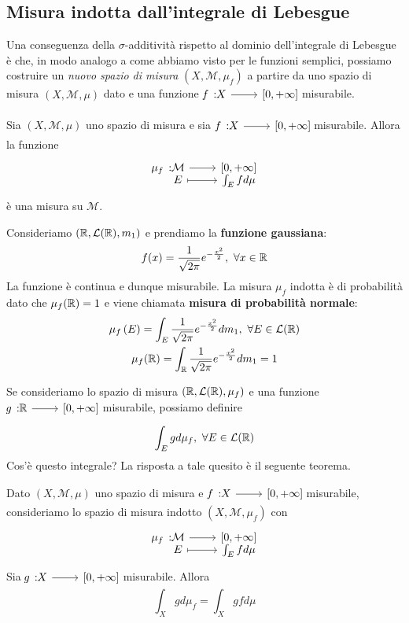 \subsection{Misura indotta dall'integrale di Lebesgue}\label{misuraindotta}
Una conseguenza della $\sigma$-additività rispetto al dominio dell'integrale di Lebesgue è che, in modo analogo a come abbiamo visto per le funzioni semplici, possiamo costruire un \textit{nuovo spazio di misura} $\left(X,\mathcal{M},\mu_f\right)$ a partire da uno spazio di misura $\left(X,\mathcal{M},\mu\right)$ dato e una funzione $\funz{f}{X}{\left[0,+\infty\right]}$ misurabile.
\begin{corollaryqed}
Sia $\left(X,\mathcal{M},\mu\right)$ uno spazio di misura e sia $\funz{f}{X}{\left[0,+\infty\right]}$ misurabile. Allora la funzione
\begin{equation}
	\funztot{\mu_f}{\mathcal{M}}{\left[0,+\infty\right]}{E}{\int_Efd\mu}
\end{equation}
è una misura su $\mathcal{M}$.
\end{corollaryqed}
\begin{example}\label{gaussiana}
	Consideriamo $\left(\mathbb{R},\mathcal{L}(\mathbb{R}),m_1\right)$ e prendiamo la \textbf{funzione gaussiana}:
	\begin{equation*}
		f(x)=\frac{1}{\sqrt{2\pi}}e^{-\frac{x^2}{2}},\ \forall x\in\realset
	\end{equation*}
	La funzione è continua e dunque misurabile. La misura $\mu_f$ indotta è di probabilità dato che $\mu_f(\mathbb{R})=1$ e viene chiamata \textbf{misura di probabilità normale}:
	\begin{gather*}
		\mu_f\left(E\right)=\int_E\frac{1}{\sqrt{2\pi}}e^{-\frac{x^2}{2}}dm_1,\ \forall E\in\mathcal{L}(\realset)\\
		\mu_f(\realset)=\int_{\realset}\frac{1}{\sqrt{2\pi}}e^{-\frac{x^2}{2}}dm_1=1
	\end{gather*}
\end{example}
Se consideriamo lo spazio di misura $\left(\mathbb{R},\mathcal{L}(\mathbb{R}),\mu_f\right)$ e una funzione $\funz{g}{\realset}{\left[0,+\infty\right]}$ misurabile, possiamo definire \begin{equation*}
	\int_Egd\mu_f,\ \forall E\in\mathcal{L}(\mathbb{R})
\end{equation*}
Cos'è questo integrale? La risposta a tale quesito è il seguente teorema.
\begin{theorema}
	Dato $\left(X,\mathcal{M},\mu\right)$ uno spazio di misura e $\funz{f}{X}{\left[0,+\infty\right]}$ misurabile, consideriamo lo spazio di misura indotto $\left(X,\mathcal{M},\mu_f\right)$ con
	\begin{equation*}
		\funztot{\mu_f}{\mathcal{M}}{\left[0,+\infty\right]}{E}{\int_Efd\mu}
	\end{equation*}
	Sia $\funz{g}{X}{\left[0,+\infty\right]}$ misurabile. Allora
	\begin{equation}
		\int_Xgd\mu_f=\int_Xgfd\mu
	\end{equation}
\end{theorema}
